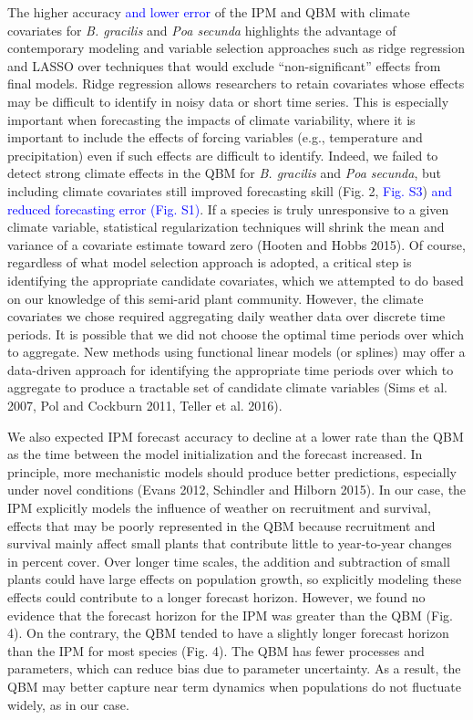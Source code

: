 \documentclass[12pt,]{article}
\begin{document}
The higher accuracy \textcolor{blue}{and lower error} of the IPM and QBM
with climate covariates for \emph{B. gracilis} and \emph{Poa secunda}
highlights the advantage of contemporary modeling and variable selection
approaches such as ridge regression and LASSO over techniques that would
exclude ``non-significant'' effects from final models. Ridge regression
allows researchers to retain covariates whose effects may be difficult
to identify in noisy data or short time series. This is especially
important when forecasting the impacts of climate variability, where it
is important to include the effects of forcing variables (e.g.,
temperature and precipitation) even if such effects are difficult to
identify. Indeed, we failed to detect strong climate effects in the QBM
for \emph{B. gracilis} and \emph{Poa secunda}, but including climate
covariates still improved forecasting skill (Fig. 2,
\textcolor{blue}{Fig. S3})
\textcolor{blue}{and reduced forecasting error (Fig. S1)}. If a species
is truly unresponsive to a given climate variable, statistical
regularization techniques will shrink the mean and variance of a
covariate estimate toward zero (Hooten and Hobbs 2015). Of course,
regardless of what model selection approach is adopted, a critical step
is identifying the appropriate candidate covariates, which we attempted
to do based on our knowledge of this semi-arid plant community. However,
the climate covariates we chose required aggregating daily weather data
over discrete time periods. It is possible that we did not choose the
optimal time periods over which to aggregate. New methods using
functional linear models (or splines) may offer a data-driven approach
for identifying the appropriate time periods over which to aggregate to
produce a tractable set of candidate climate variables (Sims et al.
2007, Pol and Cockburn 2011, Teller et al. 2016).

We also expected IPM forecast accuracy to decline at a lower rate than
the QBM as the time between the model initialization and the forecast
increased. In principle, more mechanistic models should produce better
predictions, especially under novel conditions (Evans 2012, Schindler
and Hilborn 2015). In our case, the IPM explicitly models the influence
of weather on recruitment and survival, effects that may be poorly
represented in the QBM because recruitment and survival mainly affect
small plants that contribute little to year-to-year changes in percent
cover. Over longer time scales, the addition and subtraction of small
plants could have large effects on population growth, so explicitly
modeling these effects could contribute to a longer forecast horizon.
However, we found no evidence that the forecast horizon for the IPM was
greater than the QBM (Fig. 4). On the contrary, the QBM tended to have a
slightly longer forecast horizon than the IPM for most species (Fig. 4).
The QBM has fewer processes and parameters, which can reduce bias due to
parameter uncertainty. As a result, the QBM may better capture near term
dynamics when populations do not fluctuate widely, as in our case.
\end{document}
